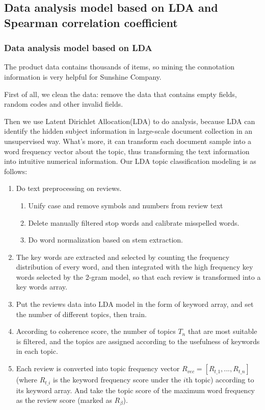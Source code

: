 \documentclass{mcmthesis}
\begin{document}
\subsection{Data analysis model based on LDA and Spearman correlation coefficient}
\subsubsection{Data analysis model based on LDA}
The product data contains thousands of items, so mining the connotation information is very helpful for Sunshine Company.

First of all, we clean the data: remove the data that contains empty fields, random codes and other invalid fields. 

Then we use Latent Dirichlet Allocation(LDA)\cite{blei2003latent} to do analysis, because LDA can identify the hidden subject information in large-scale document collection in an unsupervised way. What's more, it can transform each document sample into a word frequency vector about the topic, thus transforming the text information into intuitive numerical information. Our LDA topic classification modeling is as follows:
\begin{enumerate}
	\item Do text preprocessing on reviews.
		\begin{enumerate}
			\item Unify case and remove symbols and numbers from review text
			\item Delete manually filtered stop words and calibrate misspelled words.
			\item Do word normalization based on stem extraction.
		\end{enumerate}
	\item The key words are extracted and selected by counting the frequency distribution of every word, and then integrated with the high frequency key words selected by the 2-gram model\cite{zhang2006lord}, so that each review is transformed into a key words array.
	\item Put the reviews data into LDA model in the form of  keyword array, and set the number of different topics, then train.
	\item According to coherence score, the number of topics $T_{n}$ that are most suitable is filtered, and the topics are assigned according to the usefulness of keywords in each topic.
	\item Each review is converted into topic frequency vector $R_{vec}=[R_{t\_1},...,R_{t\_n}]$  (where $R_{t\_i}$ is the keyword frequency score under the $i$th topic) according to its keyword array. And take the topic score of the maximum word frequency as the review score (marked as $R_{\beta}$).
\end{enumerate}
\end{document}
